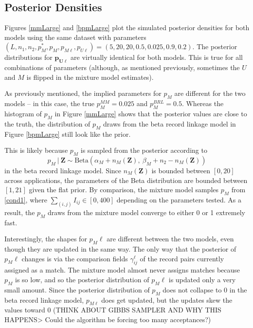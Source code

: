 \documentclass[11pt,reqno]{amsart}
\begin{document}
\subsection{Posterior Densities}

Figures \ref{mmLarge} and \ref{bpmLarge} plot the simulated posterior densities for both models using the same dataset with parameters $(L, n_1, n_2, p_M^*, p_M, p_{M\ell}, p_{U\ell}) = (5, 20, 20, 0.5,0.025,0.9,0.2)$.   The posterior distributions for $\mathbf{p_{U\ell}}$ are virtually identical for both models.  This is true for all combinations of parameters (although, as mentioned previously, sometimes the $U$ and $M$ is flipped in the mixture model estimates).  

As previously mentioned, the implied parameters for $p_M$ are different for the two models -- in this case, the true $p_M^{MM} = 0.025$ and $p_M^{BRL} = 0.5$.  Whereas the histogram of $p_M$ in Figure \ref{mmLarge} shows that the posterior values are close to the truth, the distribution of $p_M$ draws from the beta record linkage model in Figure \ref{bpmLarge} still look like the prior.  

This is likely because $p_M$ is sampled from the posterior according to 
\begin{equation} p_M\ |\ \mathbf{Z} \sim \text{Beta}(\alpha_M + n_{M}(\mathbf{Z}),\ \beta_M + n_{2} - n_{M}(\mathbf{Z})) \end{equation}
in the beta record linkage model.  Since $n_M(\textbf{Z})$ is bounded between $[0,20]$ across applications, the parameters of the Beta distribution are bounded between $[1,21]$ given the flat prior.  By comparison, the mixture model samples $p_M$ from \ref{cond1}, where $\sum_{(i,j)}I_{ij} \in [0,400]$ depending on the parameters tested.  As a result, the $p_M$ draws from the mixture model converge to either 0 or 1 extremely fast. 

Interestingly, the shapes for $p_M{\ell}$ are different between the two models, even though they are updated in the same way.  The only way that the posterior of $p_M{\ell}$ changes is via the comparison fields $\gamma_{ij}^{\ell}$ of the record pairs currently assigned as a match.  The mixture model almost never assigns matches because $p_M$ is so low, and so the posterior distribution of $p_M{\ell}$ is updated only a very small amount.  Since the posterior distribution of $p_M$ does not collapse to 0 in the beta record linkage model, $p_{M\ell}$ does get updated, but the updates skew the values toward 0 (THINK ABOUT GIBBS SAMPLER AND WHY THIS HAPPENS> Could the algorithm be forcing too many acceptances?)  
\end{document}
